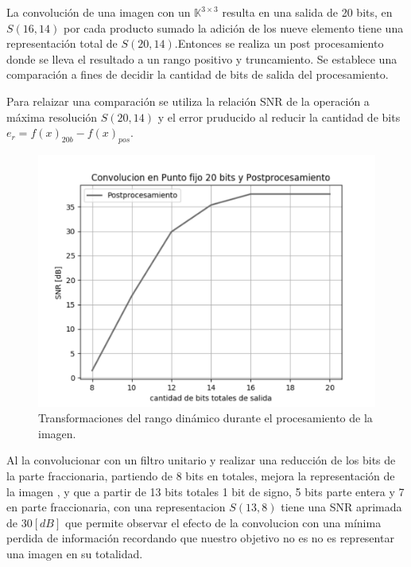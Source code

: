 \documentclass[a4paper]{article}
\begin{document}
La convoluci\'on de una imagen con un $\mathbb{K}^{3{\times}3}$ resulta en una 
salida de 20 bits, en \(S(16,14)\) por cada producto sumado la adici\'on de los nueve
elemento tiene una representaci\'on total de \(S(20,14)\).Entonces se realiza un
post procesamiento donde se lleva el resultado a un rango positivo y truncamiento.
Se establece una comparaci\'on a fines de decidir la cantidad de bits de salida del
procesamiento.

Para relaizar una comparaci\'on se utiliza la relaci\'on SNR de la operaci\'on a m\'axima
resoluci\'on \(S(20,14)\) y el error pruducido al reducir la cantidad de bits
\(e_r=f(x)_{20b}-f(x)_{pos}\)\cite{srntesis}.

\begin{figure}[H]
\centering
\includegraphics[scale=0.47]{posprocesamiento2}
\caption{Transformaciones del rango dinámico durante el procesamiento de la imagen.}
\label{prepro2}
\end{figure}

Al la convolucionar con un filtro unitario y realizar una reducci\'on de los bits de
la parte fraccionaria, partiendo de 8 bits en totales, mejora la representaci\'on de la
imagen , y que a partir de 13 bits totales 1 bit de signo, 5 bits parte entera y
7 en parte fraccionaria, con una representacion \(S(13,8)\) tiene una SNR
aprimada de \(30 [dB]\) que permite observar el efecto de la convolucion con una
m\'inima perdida de informaci\'on recordando que nuestro objetivo no es no es
representar una imagen en su totalidad.
\end{document}
